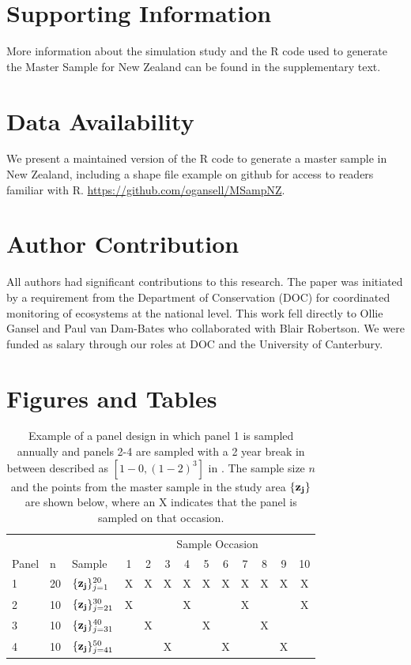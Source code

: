 \documentclass[titlepage]{article}
\begin{document}
\section{Supporting Information}
More information about the simulation study and the R code used to generate the Master Sample for New Zealand can be found in the supplementary text.

\section{Data Availability}
We present a maintained version of the R code to generate a master sample in New Zealand, including a shape file example on github for access to readers familiar with R. \url{https://github.com/ogansell/MSampNZ}.

\section{Author Contribution}
All authors had significant contributions to this research. The paper was initiated by a requirement from the Department of Conservation (DOC) for coordinated monitoring of ecosystems at the national level. This work fell directly to Ollie Gansel and Paul van Dam-Bates who collaborated with Blair Robertson. We were funded as salary through our roles at DOC and the University of Canterbury.

\newpage
\section*{Figures and Tables}

\begin{table}[H]
	\caption{Example of a panel design in which panel 1 is sampled annually and panels 2-4 are sampled with a 2 year break in between described as $[1-0,(1-2)^3]$ in \citet{Mcdonald2003}. The sample size $n$ and the points from the master sample in the study area ${\{\bf z_j\}}$ are shown below, where an X indicates that the panel is sampled on that occasion.}
	\begin{tabular}{l l l c c c c c c c c c c }
	\hline
	& & & \multicolumn{10}{c}{Sample Occasion}\\ 
	\cline{4-13}
	Panel & n & Sample & 1 & 2 & 3 & 4 & 5 & 6 & 7 & 8 & 9 & 10 \\ 
	\hline
	1 & 20 & $\{{\bf z_j}\}_{j=1}^{20}$ & X & X & X & X & X & X & X & X & X & X \\
	2 & 10 & $\{{\bf z_j}\}_{j=21}^{30}$ & X &   &  &X &   &   & X &   &  & X \\
	3 & 10 & $\{{\bf z_j}\}_{j=31}^{40}$ &  & X &  &  & X &   &   & X &  &   \\
	4 & 10 & $\{{\bf z_j}\}_{j=41}^{50}$ &  &   &  X  &   &   & X &   &  & X & \\
	\hline
\end{tabular}  
	\label{Panel}
\end{table}
\end{document}

